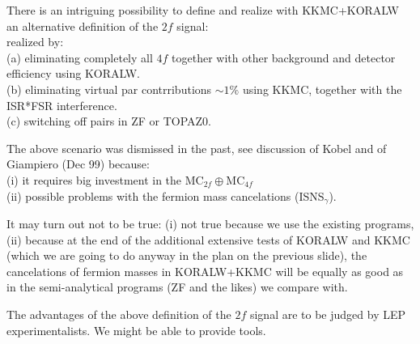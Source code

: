 \documentclass[dvips,portrait]{seminar}             %
\begin{document}
\begin{slide*}                                                %


There is an intriguing possibility to define and realize with KKMC+KORALW
an alternative definition of the $2f$ signal:\\
{\color{blue} }
realized by:\\
(a) eliminating completely all $4f$ together with other background and detector efficiency using KORALW.\\
(b) eliminating virtual par contrributions $\sim 1\%$ using KKMC, 
together with the ISR*FSR interference.\\
(c) switching off pairs in ZF or TOPAZ0.

{\small{}
The above scenario was dismissed in the past,
see discussion of Kobel and of Giampiero (Dec 99) because:\\
(i)  it requires big investment in the MC$_{2f}\oplus$MC$_{4f}$\\
(ii) possible problems with the fermion mass cancelations (ISNS$_{\gamma}$).
}

{\small\color{blue}
It may turn out not to be true:
(i) not true because we use the existing programs,
(ii) because at the end of the additional extensive tests
of KORALW and KKMC 
(which we are going to do anyway in the plan on the previous slide),
the cancelations of fermion masses in KORALW+KKMC will be equally as good as in the
semi-analytical programs (ZF and the likes) we compare with.
}

{\small{}
The advantages of the above definition of the $2f$ signal are to be judged
by LEP experimentalists. We might be able to provide tools.
}


\vfill
\end{slide*}   %
\end{document}
